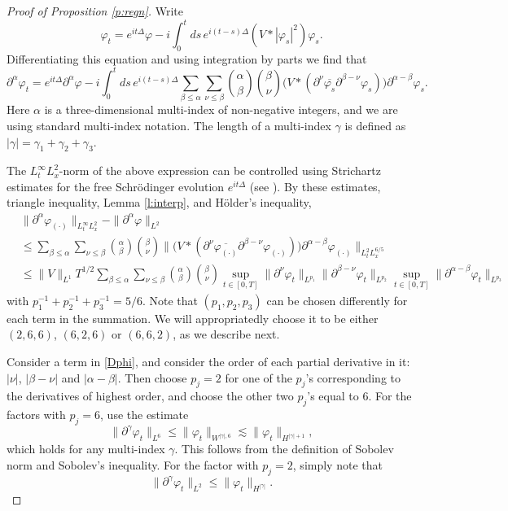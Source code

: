\documentclass[11pt,a4paper]{scrartcl}
\begin{document}
\begin{proof}[Proof of Proposition \ref{p:regn}]
  Write
  \[
    \varphi_t = e^{it\Delta} \varphi - i \int_0^t ds \, e^{i(t-s)\Delta} (V *
    |\varphi_s|^2) \varphi_s.
  \]
  Differentiating this equation and using integration by parts we find that
  \[
    \partial^\alpha \varphi_t = e^{it \Delta} \partial^\alpha \varphi - i
    \int_0^t ds \, e^{i(t-s) \Delta} \sum_{\beta \le \alpha} \sum_{\nu \le
    \beta} \binom{\alpha}{\beta} \binom{\beta}{\nu} \big( V * (\partial^\nu
    \overline{\varphi_s} \partial^{\beta - \nu} \varphi_s) \big)
    \partial^{\alpha - \beta} \varphi_s.
  \]
  Here $\alpha$ is a three-dimensional multi-index of non-negative integers,
  and we are using standard multi-index notation. The length of a multi-index
  $\gamma$ is defined as $|\gamma| = \gamma_1 + \gamma_2 + \gamma_3$.


  The $L_t^\infty L_x^2$-norm of the above expression can be controlled using
  Strichartz estimates for the free Schr\"odinger evolution $e^{it\Delta}$
  (see \cite[Theorem 1.2]{KT}). By these estimates, triangle inequality, Lemma
  \ref{l:interp}, and H\"older's inequality,
  \begin{equation} \label{Dphi}
    \begin{split}
      & \| \partial^\alpha \varphi_{(\cdot)} \|_{L_t^\infty L_x^2} - \|
      \partial^\alpha \varphi \|_{L^2} \\
      & \le \sum_{\beta \le \alpha} \sum_{\nu \le \beta} \binom{\alpha}{\beta}
      \binom{\beta}{\nu} \| \big( V * (\partial^\nu
      \overline{\varphi_{(\cdot)}} \partial^{\beta - \nu} \varphi_{(\cdot)})
      \big) \partial^{\alpha - \beta} \varphi_{(\cdot)} \|_{L_t^2 L_x^{6/5}}
      \\
      & \le \| V \|_{L^1} T^{1/2} \sum_{\beta \le \alpha} \sum_{\nu \le \beta}
      \binom{\alpha}{\beta} \binom{\beta}{\nu} \sup_{t \in [0,T]} \|
      \partial^\nu \varphi_t \|_{L^{p_1}} \| \partial^{\beta - \nu} \varphi_t
      \|_{L^{p_2}} \sup_{t \in [0,T]} \| \partial^{\alpha - \beta} \varphi_t
      \|_{L^{p_3}}
    \end{split}
  \end{equation}
  with $p_1^{-1} + p_2^{-1} + p_3^{-1} = 5/6$. Note that $(p_1, p_2, p_3)$ can
  be chosen differently for each term in the summation. We will appropriatedly
  choose it to be either $(2,6,6)$, $(6,2,6)$ or $(6,6,2)$, as we describe
  next.


  Consider a term in \eqref{Dphi}, and consider the order of each partial
  derivative in it: $|\nu|$, $|\beta-\nu|$ and $|\alpha-\beta|$. Then choose
  $p_j = 2$ for one of the $p_j$'s corresponding to the derivatives of highest
  order, and choose the other two $p_j$'s equal to $6$. For the factors with
  $p_j = 6$, use the estimate
  \[
    \| \partial^\gamma \varphi_t \|_{L^6} \le \| \varphi_t \|_{W^{|\gamma|,6}}
    \apprle \| \varphi_t \|_{H^{|\gamma|+1}},
  \]
  which holds for any multi-index $\gamma$. This follows from the definition
  of Sobolev norm and Sobolev's inequality. For the factor with $p_j = 2$,
  simply note that
  \[
    \| \partial^\gamma \varphi_t \|_{L^2} \le \| \varphi_t \|_{H^{|\gamma|}}.
  \]



\end{proof}
\end{document}

